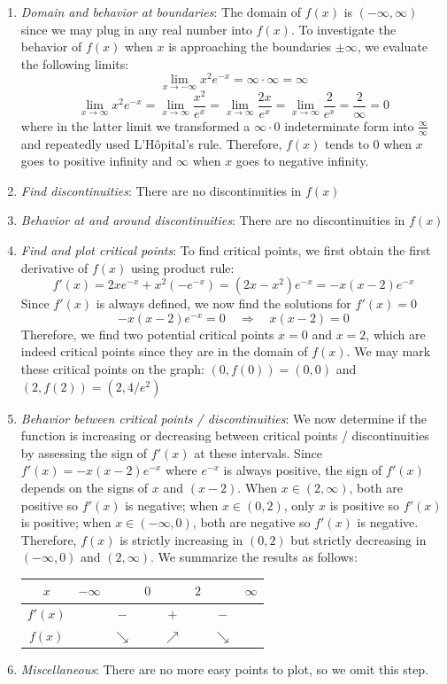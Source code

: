 \documentclass[11pt,letterpaper]{article}
\begin{document}
\begin{enumerate}
    \item \textit{Domain and behavior at boundaries}: The domain of $f(x)$ is $(-\infty, \infty)$ since we may plug in any real number into $f(x)$.  To investigate the behavior of $f(x)$ when $x$ is approaching the boundaries $\pm \infty$, we evaluate the following limits:
    \[\lim_{x\rightarrow-\infty} x^2e^{-x} = \infty \cdot \infty = \infty\]
    \[\lim_{x\rightarrow\infty} x^2e^{-x} = \lim_{x\rightarrow\infty} \frac{x^2}{e^{x}} = \lim_{x\rightarrow\infty} \frac{2x}{e^{x}} = \lim_{x\rightarrow\infty} \frac{2}{e^{x}} = \frac{2}{\infty} = 0\]
    where in the latter limit we transformed a $\infty \cdot 0$ indeterminate form into $\frac{\infty}{\infty}$ and repeatedly used L'Hôpital's rule.  Therefore, $f(x)$ tends to $0$ when $x$ goes to positive infinity and $\infty$ when $x$ goes to negative infinity.
    \item \textit{Find discontinuities}: There are no discontinuities in $f(x)$
    \item \textit{Behavior at and around discontinuities}: There are no discontinuities in $f(x)$
    \item \textit{Find and plot critical points}: To find critical points, we first obtain the first derivative of $f(x)$ using product rule:
    \[f'(x) = 2xe^{-x} + x^2(-e^{-x}) = (2x-x^2)e^{-x} = -x(x-2)e^{-x}\]
    Since $f'(x)$ is always defined, we now find the solutions for $f'(x) = 0$
    \[-x(x-2)e^{-x} = 0 \quad \Rightarrow \quad  x(x-2) = 0\]
    Therefore, we find two potential critical points $x=0$ and $x=2$, which are indeed critical points since they are in the domain of $f(x)$.  We may mark these critical points on the graph: $(0, f(0)) = (0, 0)$ and $(2, f(2)) = (2, 4/e^2)$
    \item \textit{Behavior between critical points / discontinuities}: We now determine if the function is increasing or decreasing between critical points / discontinuities by assessing the sign of $f'(x)$ at these intervals.  Since $f'(x) = -x(x-2)e^{-x}$ where $e^{-x}$ is always positive, the sign of $f'(x)$ depends on the signs of $x$ and $(x-2)$.  When $x \in (2, \infty)$, both are positive so $f'(x)$ is negative; when $x \in (0, 2)$, only $x$ is positive so $f'(x)$ is positive; when $x \in (-\infty, 0)$, both are negative so $f'(x)$ is negative.  Therefore, $f(x)$ is strictly increasing in $(0,2)$ but strictly decreasing in $(-\infty, 0)$ and $(2, \infty)$. We summarize the results as follows:
    \begin{table}[h]
        \centering
        \begin{tabular}{c|ccccccc}
            $x$ &$-\infty$& &$0$& &$2$& &$\infty$ \\
            \hline
            $f'(x)$ & & $-$ & & $+$ & & $-$ & \\
            $f(x)$  & & $\searrow$ & & $\nearrow$ & & $\searrow$ &
        \end{tabular}
    \end{table}
    \item \textit{Miscellaneous}: There are no more easy points to plot, so we omit this step.
\end{enumerate}
\vspace{6mm}
\end{document}

